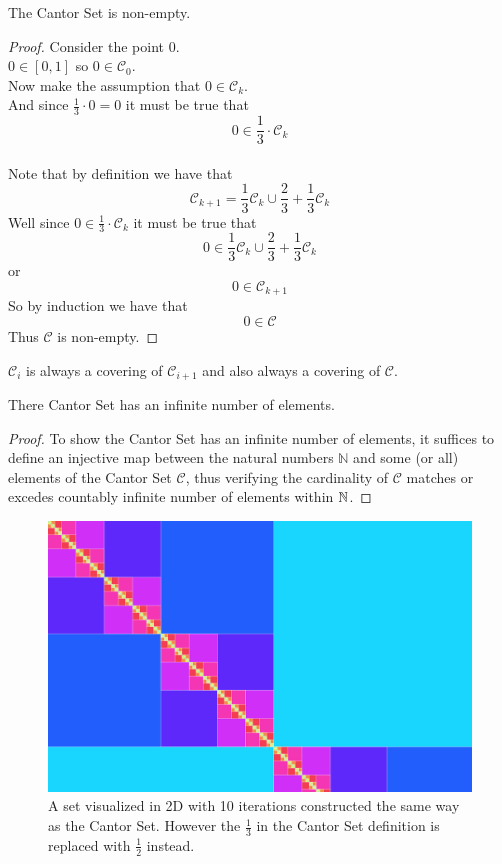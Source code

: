 \documentclass[11pt]{ekblite}
\begin{document}
	\begin{corollary}
		The Cantor Set is non-empty.
	\end{corollary}
	\begin{proof}Consider the point 0.
	\\[0.2in]$0 \in [0,1]$ so $0 \in \mathcal{C}_0$.
	\\[0.2in]Now make the assumption that $0 \in \mathcal{C}_k$.
	\\[0.2in]And since $\frac{1}{3} \cdot 0 = 0$ it must be true that
	\[0 \in \frac{1}{3} \cdot \mathcal{C}_k\] 
	\\[0.2in]Note that by definition we have that
	\[\mathcal{C}_{k+1} = \frac{1}{3} \mathcal{C}_{k} \cup \frac{2}{3} + \frac{1}{3} \mathcal{C}_{k}\]
	Well since $0 \in \frac{1}{3} \cdot \mathcal{C}_k$ it must be true that
	\[0 \in \frac{1}{3} \mathcal{C}_{k} \cup \frac{2}{3} + \frac{1}{3} \mathcal{C}_{k}\]
	or
	\[0 \in \mathcal{C}_{k+1}\]
	So by induction we have that
	\[0 \in \mathcal{C}\]
	Thus $\mathcal{C}$ is non-empty.
	\end{proof}
	\begin{corollary}
		$\mathcal{C}_{i}$ is always a covering of $\mathcal{C}_{i+1}$ and also always a covering of $\mathcal{C}$.
	\end{corollary}
	\begin{corollary}
		There Cantor Set has an infinite number of elements.
	\end{corollary}
	\begin{proof}
		To show the Cantor Set has an infinite number of elements, it suffices to define an injective map between the natural numbers $\mathbb{N}$ and some (or all) elements of the Cantor Set $\mathcal{C}$, thus verifying the cardinality of $\mathcal{C}$ matches or excedes countably infinite number of elements within $\mathbb{N}$.
	\end{proof}
	\newpage
	\begin{figure}[h]
		\includegraphics[scale=0.2]{img/c8.jpg}
		\caption{A set visualized in 2D with 10 iterations constructed the same way as the Cantor Set. However the $\frac{1}{3}$ in the Cantor Set definition is replaced with $\frac{1}{2}$ instead.}
	\end{figure}
\end{document}

